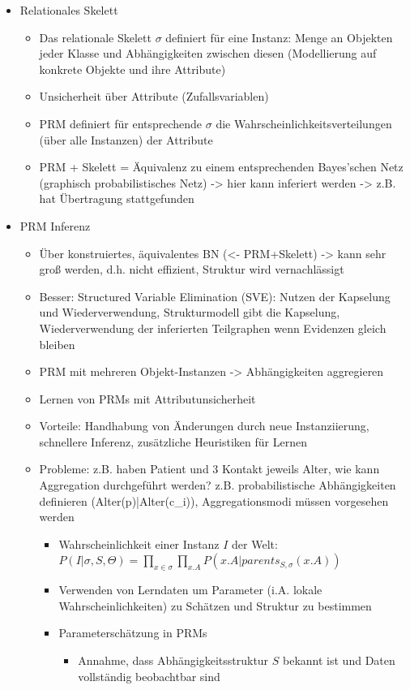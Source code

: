 \documentclass[paper=a4, fontsize=11pt]{scrartcl} %
\numberwithin{equation}{section} %
\numberwithin{figure}{section} %
\numberwithin{table}{section} %
\begin{document}
\begin{itemize}
\item Relationales Skelett
\begin{itemize}
\item Das relationale Skelett $\sigma$ definiert für eine Instanz: Menge an Objekten jeder Klasse und Abhängigkeiten zwischen diesen (Modellierung auf konkrete Objekte und ihre Attribute)
\item Unsicherheit über Attribute (Zufallsvariablen)
\item PRM definiert für entsprechende $\sigma$ die Wahrscheinlichkeitsverteilungen (über alle Instanzen) der Attribute
\item PRM + Skelett = Äquivalenz zu einem entsprechenden Bayes'schen Netz (graphisch probabilistisches Netz) -> hier kann inferiert werden -> z.B. hat Übertragung stattgefunden
\end{itemize}
\item PRM Inferenz
\begin{itemize}
\item Über konstruiertes, äquivalentes BN (<- PRM+Skelett) -> kann sehr groß werden, d.h. nicht effizient, Struktur wird vernachlässigt
\item Besser: Structured Variable Elimination (SVE): Nutzen der Kapselung und Wiederverwendung, Strukturmodell gibt die Kapselung, Wiederverwendung der inferierten Teilgraphen wenn Evidenzen gleich bleiben
\item PRM mit mehreren Objekt-Instanzen -> Abhängigkeiten aggregieren
\item Lernen von PRMs mit Attributunsicherheit
\item Vorteile: Handhabung von Änderungen durch neue Instanziierung, schnellere Inferenz, zusätzliche Heuristiken für Lernen
\item Probleme: z.B. haben Patient und 3 Kontakt jeweils Alter, wie kann Aggregation durchgeführt werden? z.B. probabilistische Abhängigkeiten definieren (Alter(p)|Alter(c\_i)), Aggregationsmodi müssen vorgesehen werden
\begin{itemize}
\item Wahrscheinlichkeit einer Instanz $I$ der Welt: $P(I|\sigma,S,\Theta) = \prod\limits_{x \in \sigma} \prod\limits_{x.A} P(x.A|parents_{S,\sigma}(x.A))$
\item Verwenden von Lerndaten um Parameter (i.A. lokale Wahrscheinlichkeiten) zu Schätzen und Struktur zu bestimmen
\item Parameterschätzung in PRMs
\begin{itemize}
\item Annahme, dass Abhängigkeitsstruktur $S$ bekannt ist und Daten vollständig beobachtbar sind

\end{itemize}
\end{itemize}
\end{itemize}
\end{itemize}
\end{document}
